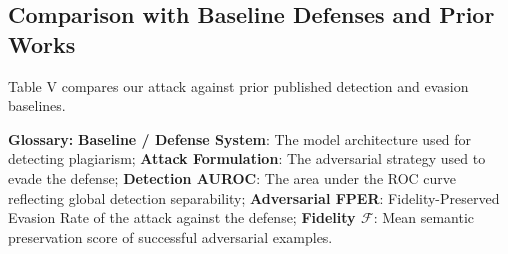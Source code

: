 \documentclass[conference,onecolumn,11pt]{IEEEtran}
\begin{document}
\subsection{Comparison with Baseline Defenses and Prior Works}

Table V compares our attack against prior published detection and evasion baselines.

\begin{table}[htbp]
\centering
\caption{Comparative Benchmarking Against Baseline Detection Approaches.}
\label{tab:baseline_comparison}
\vspace{1em}
\small \textbf{Glossary:} \textbf{Baseline / Defense System}: The model architecture used for detecting plagiarism; \textbf{Attack Formulation}: The adversarial strategy used to evade the defense; \textbf{Detection AUROC}: The area under the ROC curve reflecting global detection separability; \textbf{Adversarial FPER}: Fidelity-Preserved Evasion Rate of the attack against the defense; \textbf{Fidelity $\mathcal{F}$}: Mean semantic preservation score of successful adversarial examples.
\end{table}
\end{document}
